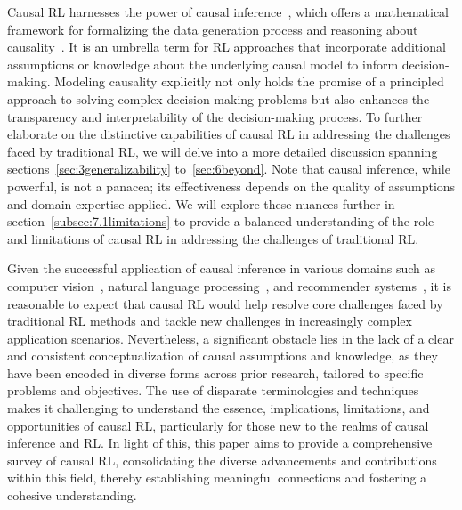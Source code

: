 \documentclass[10pt]{article} %
\theoremstyle{definition}
\begin{document}
Causal RL harnesses the power of causal inference~\citep{pearlCausality2009,petersElementsCausalInference2017}, which offers a mathematical framework for formalizing the data generation process and reasoning about causality~\citep{scholkopfCausalRepresentationLearning2021a, kaddourCausalMachineLearning2022b}. 
It is an umbrella term for RL approaches that incorporate additional assumptions or knowledge about the underlying causal model to inform decision-making. 
Modeling causality explicitly not only holds the promise of a principled approach to solving complex decision-making problems but also enhances the transparency and interpretability of the decision-making process. 
To further elaborate on the distinctive capabilities of causal RL in addressing the challenges faced by traditional RL, we will delve into a more detailed discussion spanning sections~\ref{sec:3generalizability} to~\ref{sec:6beyond}. 
Note that causal inference, while powerful, is not a panacea; its effectiveness depends on the quality of assumptions and domain expertise applied. 
We will explore these nuances further in section~\ref{subsec:7.1limitations} to provide a balanced understanding of the role and limitations of causal RL in addressing the challenges of traditional RL.

Given the successful application of causal inference in various domains such as computer vision~\citep{lopez-pazDiscoveringCausalSignals2017, shenCausallyRegularizedLearning2018a, tangUnbiasedSceneGraph2020,wangVisualCommonsenseRCNN2020}, natural language processing~\citep{wuDiscoveringTopicsLongtailed2021, jinCausalDirectionData2021, federCausalInferenceNatural2022}, and recommender systems~\citep{zhengDisentanglingUserInterest2021, zhangCausalInterventionLeveraging2021, gaoCausalInferenceRecommender2022a}, it is reasonable to expect that causal RL would help resolve core challenges faced by traditional RL methods and tackle new challenges in increasingly complex application scenarios. 
Nevertheless, a significant obstacle lies in the lack of a clear and consistent conceptualization of causal assumptions and knowledge, as they have been encoded in diverse forms across prior research, tailored to specific problems and objectives. 
The use of disparate terminologies and techniques makes it challenging to understand the essence, implications, limitations, and opportunities of causal RL, particularly for those new to the realms of causal inference and RL. 
In light of this, this paper aims to provide a comprehensive survey of causal RL, consolidating the diverse advancements and contributions within this field, thereby establishing meaningful connections and fostering a cohesive understanding.
\end{document}

